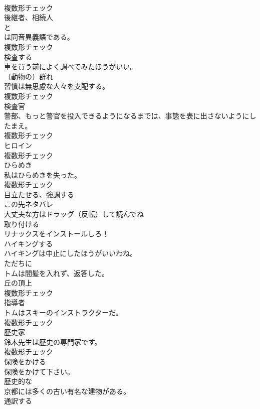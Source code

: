 \documentclass[8pt]{extreport}
\begin{document}
\begin{CJK}{UTF8}{min}
\\	複数形チェック
\\	[名詞]	後継者、相続人	
\\	と 
\\	は同音異義語である。	
\\	複数形チェック
\\	[動詞]	検査する	
\\	車を買う前によく調べてみたほうがいい。	
\\	[名詞]	（動物の）群れ	
\\	習慣は無思慮な人々を支配する。	
\\	複数形チェック
\\	[名詞]	検査官	
\\	警部、もっと警官を投入できるようになるまでは、事態を表に出さないようにしたまえ。	
\\	複数形チェック
\\	[名詞]	ヒロイン	
\\	複数形チェック
\\	[名詞]	ひらめき	
\\	私はひらめきを失った。	
\\	複数形チェック
\\	[動詞]	目立たせる、強調する	
\\	この先ネタバレ
\\	大丈夫な方はドラッグ（反転）して読んでね
\\	[動詞]	取り付ける	
\\	リナックスをインストールしろ！	
\\	[動詞]	ハイキングする	
\\	ハイキングは中止にしたほうがいいわね。	
\\	[副詞]	ただちに	
\\	トムは間髪を入れず、返答した。	
\\	[名詞]	丘の頂上	
\\	複数形チェック
\\	[名詞]	指導者	
\\	トムはスキーのインストラクターだ。	
\\	複数形チェック
\\	[名詞]	歴史家	
\\	鈴木先生は歴史の専門家です。	
\\	複数形チェック
\\	[動詞]	保険をかける	
\\	保険をかけて下さい。	
\\	[形容詞]	歴史的な	
\\	京都には多くの古い有名な建物がある。	
\\	[動詞]	通訳する	

\end{CJK}
\end{document}
